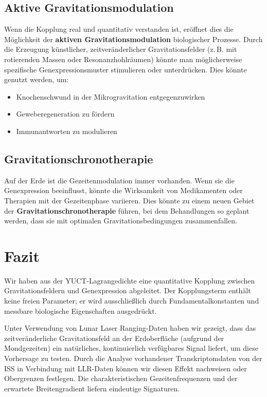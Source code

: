 \documentclass[12pt,a4paper]{article}
\theoremstyle{remark}
\begin{document}
	\subsection{Aktive Gravitationsmodulation}
	
	Wenn die Kopplung real und quantitativ verstanden ist, eröffnet dies die Möglichkeit der \textbf{aktiven Gravitationsmodulation} biologischer Prozesse. Durch die Erzeugung künstlicher, zeitveränderlicher Gravitationsfelder (z. B. mit rotierenden Massen oder Resonanzhohlräumen) könnte man möglicherweise spezifische Genexpressionsmuster stimulieren oder unterdrücken. Dies könnte genutzt werden, um:
	\begin{itemize}
		\item Knochenschwund in der Mikrogravitation entgegenzuwirken
		\item Geweberegeneration zu fördern
		\item Immunantworten zu modulieren
	\end{itemize}
	
	\subsection{Gravitationschronotherapie}
	
	Auf der Erde ist die Gezeitenmodulation immer vorhanden. Wenn sie die Genexpression beeinflusst, könnte die Wirksamkeit von Medikamenten oder Therapien mit der Gezeitenphase variieren. Dies könnte zu einem neuen Gebiet der \textbf{Gravitationschronotherapie} führen, bei dem Behandlungen so geplant werden, dass sie mit optimalen Gravitationsbedingungen zusammenfallen.
	
	\section{Fazit}
	\label{sec:conclusion}
	
	Wir haben aus der YUCT-Lagrangedichte eine quantitative Kopplung zwischen Gravitationsfeldern und Genexpression abgeleitet. Der Kopplungsterm enthält keine freien Parameter; er wird ausschließlich durch Fundamentalkonstanten und messbare biologische Eigenschaften ausgedrückt.
	
	Unter Verwendung von Lunar Laser Ranging-Daten haben wir gezeigt, dass das zeitveränderliche Gravitationsfeld an der Erdoberfläche (aufgrund der Mondgezeiten) ein natürliches, kontinuierlich verfügbares Signal liefert, um diese Vorhersage zu testen. Durch die Analyse vorhandener Transkriptomdaten von der ISS in Verbindung mit LLR-Daten können wir diesen Effekt nachweisen oder Obergrenzen festlegen. Die charakteristischen Gezeitenfrequenzen und der erwartete Breitengradient liefern eindeutige Signaturen.
	
\end{document}
